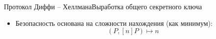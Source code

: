 \documentclass{beamer}
\begin{document}
	\begin{frame}{Протокол Диффи -- Хеллмана}{Выработка общего секретного ключа}
		\begin{center}
			
		\end{center}
		\begin{itemize}
			\item Безопасность основана на сложности нахождения  (как минимум): \[(P, [n]P) \mapsto n\]
		\end{itemize}
	\end{frame}
	
\end{document}
